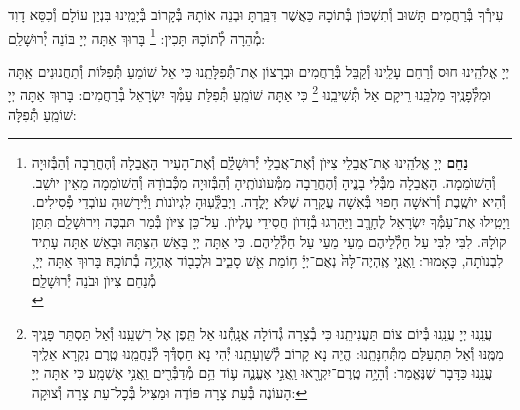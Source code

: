 \documentclass[twoside, openany, parskip=half, 11pt]{book}
\begin{document}
\amidaopening{\ayt}{}

\weekdaysakedusha \vspace{0.5\baselineskip}

\sepline

\weekdaysabinah

\weekdaysateshuva

\weekdaysaselichah

\weekdaysageulah

\weekdaysaanneinu

\weekdaysarefuah

\weekdaysaberacha

\weekdaysashofar

\weekdaysamishpat

\weekdaysaminim

\weekdaysatzadikim

עִירְ֯ךָ בְּ֯רַחֲמִים תָּשׁוּב וְ֯תִשְׁכּוֹן בְּ֯תוֹכָהּ כַּאֲשֶׁר דִּבַּֽרְתָּ וּבְנֵה אוֹתָהּ בְּ֯קָרוֹב בְּ֯יָמֵֽינוּ בִּנְיַן עוֹלָם וְ֯כִסֵּא דָוִד מְ֯הֵרָה לְ֯תוֹכָהּ תָּכִין:
\footnote{
\textbf{נַחֵם}
יְיָ אֱלֹהֵֽינוּ אֶת־אֲבֵלֵי צִיּוֺן וְ֯אֶת־אֲבֵלֵי יְ֯רוּשָׁלַֽ֔֗͏ִם וְ֯אֶת־הָעִיר הָאֲבֵלָה וְ֯הֶחֳרֵבָה וְ֯הַבְּ֯זוּיָה וְ֯הַשׁוֺמֵמָה. הָאֲבֵלָה מִבְּ֯לִי בָנֱיהָ וְ֯הֶחֳרֵבָה מִמְּ֯עוֺנוֺתֶֽיהָ וְ֯הַבְּ֯זוּיָה מִכְּ֯בוֺדָהּ וְ֯הַשׁוֺמֵמָה מֵאֵין יוֺשֵׁב. וְ֯הִיא יוֺשֶֽׁבֶת וְ֯רֹאשָׁה חָפוּי בְּ֯אִשָׁה עֲקַרָה שֶׁלֹּא יָלֳדָה. וַיְבַלְְּ֯עֽוּהָ לִגְיוֺנוֺת וַיְּ֯ירָשׁוּהָ עוֺבְדֵי פְ֯סִילִים. וַיָטִֽילוּ אֶת־עַמְּ֯ךָ יִשְׂרָאֵל לֶחָרֱֽב וַיַּהַרְגוּ בְ֯זָדוֺן חֲסִידֵי עֶלְיוֺן. עַל־כֵּן צִיּוֺן בְּ֯מַר תּבְכֶּה וִירוּשָׁלַֽ͏ִם תִּתֵּן קוֺלָהּ. לִבִּי לִבִּי עַל חַלְ֯לֵיהֶם מֵעַי מֵעַי עַל חַלְ֯לֵיהֶם. כִּי אַתָּה יְיָ בָּאֵשׁ הִצַּתָּהּ וּבָאֵשׁ אַתָּה עָתִיד לִבְנוֺתָה, כָּאָמוּר: וַֽאֲנִ֤י אֶֽהְיֶה־לָּהּ֙ נְאֻם־יְיָ֔ ח֥וֹמַת אֵ֖שׁ סָבִ֑יב וּלְכָב֖וֹד אֶהְיֶ֥ה בְ֯תוֹכָֽהּ׃
בָּרוּךְ אַתָּה יְיָ, מְ֯נַחֵם צִיוֺן וּבֹנֵה יְ֯רוּשָׁלַֽ͏ִם׃ \\
}
בָּרוּךְ אַתָּה יְיָ בּוֹנֵה יְ֯רוּשָׁלַ‍ִם:

\weekdaysamalchus

יְיָ אֱלֹהֵֽינוּ חוּס וְ֯רַחֵם עָלֵֽינוּ וְ֯קַבֵּל בְּ֯רַחֲמִים וּבְרָצוֹן אֶת־תְּ֯פִלָּתֵֽנוּ כִּי אֵל שׁוֹמֵעַ תְּ֯פִלּוֹת וְ֯תַחֲנוּנִים אַֽתָּה וּמִלְּ֯פָנֶֽיךָ מַלְכֵּֽנוּ רֵיקָם אַל תְּ֯שִׁיבֵֽנוּ
\footnote{
עֲנֵֽנוּ יְיָ עֲנֵֽנוּ בְּ֯יוֹם צוֹם תַּעֲנִיתֵֽנוּ כִּי בְ֯צָרָה גְ֯דוֹלָה אֲנָֽחְ֯נוּ אַל תֵּֽפֶן אֶל רִשְׁעֵֽנוּ וְ֯אַל תַּסְתֵּר פָּנֶֽיךָ מִמֶּֽנּוּ וְ֯אַל תִּתְעַלַּם מִתְּ֯חִנָּתֵֽנוּ: הֱיֵה נָא קָרוֹב לְ֯שַׁוְעָתֵֽנוּ יְ֯הִי נָא חַסְדְּ֯ךָ לְ֯נַחֲמֵֽנוּ טֶֽרֶם נִקְרָא אֵלֶֽיךָ עֲנֵֽנוּ כַּדָּבָר שֶׁנֶּאֱמַר:
וְ֯הָיָ֥ה טֶֽרֶם־יִקְרָ֖אוּ וַֽאֲנִ֣י אֶעֱנֶ֑ה ע֛וֹד הֵ֥ם מְ֯דַבְּ֯רִ֖ים וַֽאֲנִ֥י אֶשְׁמָֽע׃ כִּי אַתָּה יְיָ הָעוֹנֶה בְּ֯עֵת צָרָה פּוֹדֶה וּמַצִּיל בְּ֯כׇל־עֵת צָרָה וְ֯צוּקָה:
}
כִּי אַתָּה שׁוֹמֵֽעַ תְּ֯פִלַּת עַמְּ֯ךָ יִשְׂרָאֵל בְּ֯רַחֲמִים: בָּרוּךְ אַתָּה יְיָ שׁוֹמֵֽעַ תְּ֯פִלָּה:
\end{document}
